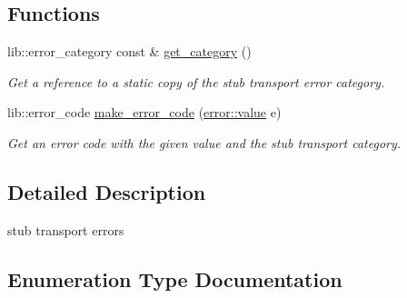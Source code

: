 \subsection*{Functions}
\begin{DoxyCompactItemize}
\item 
lib\+::error\+\_\+category const  \& \hyperlink{namespacewebsocketpp_1_1transport_1_1stub_1_1error_aa724815b97c5d35092bfda373b1e7221}{get\+\_\+category} ()\hypertarget{namespacewebsocketpp_1_1transport_1_1stub_1_1error_aa724815b97c5d35092bfda373b1e7221}{}\label{namespacewebsocketpp_1_1transport_1_1stub_1_1error_aa724815b97c5d35092bfda373b1e7221}

\begin{DoxyCompactList}\small\item\em Get a reference to a static copy of the stub transport error category. \end{DoxyCompactList}\item 
lib\+::error\+\_\+code \hyperlink{namespacewebsocketpp_1_1transport_1_1stub_1_1error_a3d51de99e5f0e3695bd69975e8746b27}{make\+\_\+error\+\_\+code} (\hyperlink{namespacewebsocketpp_1_1transport_1_1stub_1_1error_abff42d9e608f90864af8d628f6932022}{error\+::value} e)\hypertarget{namespacewebsocketpp_1_1transport_1_1stub_1_1error_a3d51de99e5f0e3695bd69975e8746b27}{}\label{namespacewebsocketpp_1_1transport_1_1stub_1_1error_a3d51de99e5f0e3695bd69975e8746b27}

\begin{DoxyCompactList}\small\item\em Get an error code with the given value and the stub transport category. \end{DoxyCompactList}\end{DoxyCompactItemize}


\subsection{Detailed Description}
stub transport errors 

\subsection{Enumeration Type Documentation}
